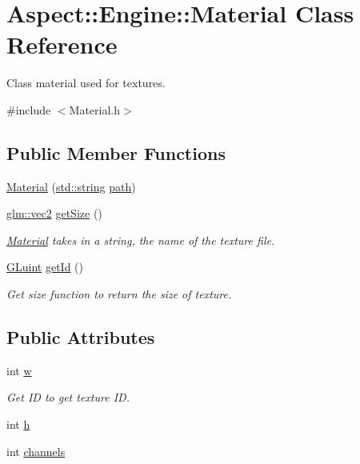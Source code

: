 \hypertarget{class_aspect_1_1_engine_1_1_material}{}\section{Aspect\+:\+:Engine\+:\+:Material Class Reference}
\label{class_aspect_1_1_engine_1_1_material}


Class material used for textures.  




{\ttfamily \#include $<$Material.\+h$>$}

\subsection*{Public Member Functions}
\begin{DoxyCompactItemize}
\item 
\mbox{\hyperlink{class_aspect_1_1_engine_1_1_material_a2c9f3f523dc327399c24b4222d4a978c}{Material}} (\mbox{\hyperlink{_s_d_l__opengl__glext_8h_ae84541b4f3d8e1ea24ec0f466a8c568b}{std\+::string}} \mbox{\hyperlink{_s_d_l__opengl__glext_8h_ab25d8cd967ccbd19b630d7100ff8f67e}{path}})
\item 
\mbox{\hyperlink{group__core__types_gaa1618f51db67eaa145db101d8c8431d8}{glm\+::vec2}} \mbox{\hyperlink{class_aspect_1_1_engine_1_1_material_a8779008ace71c3d1ee2cd551373933be}{get\+Size}} ()
\begin{DoxyCompactList}\small\item\em \mbox{\hyperlink{class_aspect_1_1_engine_1_1_material}{Material}} takes in a string, the name of the texture file. \end{DoxyCompactList}\item 
\mbox{\hyperlink{glew_8h_a68c4714e43d8e827d80759f9cb864f3c}{G\+Luint}} \mbox{\hyperlink{class_aspect_1_1_engine_1_1_material_ac4177400efde4d6ced260e707b3e5ad0}{get\+Id}} ()
\begin{DoxyCompactList}\small\item\em Get size function to return the size of texture. \end{DoxyCompactList}\end{DoxyCompactItemize}
\subsection*{Public Attributes}
\begin{DoxyCompactItemize}
\item 
int \mbox{\hyperlink{class_aspect_1_1_engine_1_1_material_a2c52f153e9878530ae68627c9a1f16be}{w}}
\begin{DoxyCompactList}\small\item\em Get ID to get texture ID. \end{DoxyCompactList}\item 
int \mbox{\hyperlink{class_aspect_1_1_engine_1_1_material_a495fcbe4e64c1814971cd9d815dd0e16}{h}}
\item 
int \mbox{\hyperlink{class_aspect_1_1_engine_1_1_material_ae0b4f29080da1fdfb87763c8b72f3110}{channels}}
\end{DoxyCompactItemize}
